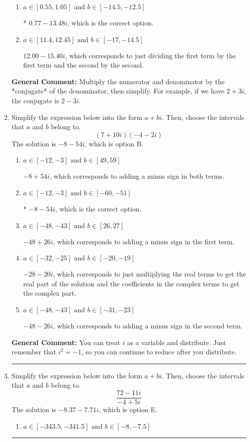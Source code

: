 \documentclass{extbook}[14pt]
\newcommand{\litem}[1]{\item #1

\rule{\textwidth}{0.4pt}}
\begin{document}
\begin{enumerate}
{\begin{enumerate}[label=\Alph*.]
 $0.77  - 822.00 i$, which corresponds to forgetting to multiply the conjugate by the numerator.
\item \( a \in [0.55, 1.05] \text{ and } b \in [-14.5, -12.5] \)

* $0.77  - 13.48 i$, which is the correct option.
\item \( a \in [11.4, 12.45] \text{ and } b \in [-17, -14.5] \)

 $12.00  - 15.40 i$, which corresponds to just dividing the first term by the first term and the second by the second.
\end{enumerate}

\textbf{General Comment:} Multiply the numerator and denominator by the *conjugate* of the denominator, then simplify. For example, if we have $2+3i$, the conjugate is $2-3i$.
}
\litem{
Simplify the expression below into the form $a+bi$. Then, choose the intervals that $a$ and $b$ belong to.
\[ (7 + 10 i)(-4 - 2 i) \]The solution is \( -8 - 54 i \), which is option B.\begin{enumerate}[label=\Alph*.]
\item \( a \in [-12, -3] \text{ and } b \in [49, 59] \)

 $-8 + 54 i$, which corresponds to adding a minus sign in both terms.
\item \( a \in [-12, -3] \text{ and } b \in [-60, -51] \)

* $-8 - 54 i$, which is the correct option.
\item \( a \in [-48, -43] \text{ and } b \in [26, 27] \)

 $-48 + 26 i$, which corresponds to adding a minus sign in the first term.
\item \( a \in [-32, -25] \text{ and } b \in [-20, -19] \)

 $-28 - 20 i$, which corresponds to just multiplying the real terms to get the real part of the solution and the coefficients in the complex terms to get the complex part.
\item \( a \in [-48, -43] \text{ and } b \in [-31, -23] \)

 $-48 - 26 i$, which corresponds to adding a minus sign in the second term.
\end{enumerate}

\textbf{General Comment:} You can treat $i$ as a variable and distribute. Just remember that $i^2=-1$, so you can continue to reduce after you distribute.
}
\litem{
Simplify the expression below into the form $a+bi$. Then, choose the intervals that $a$ and $b$ belong to.
\[ \frac{72 - 11 i}{-4 + 5 i} \]The solution is \( -8.37  - 7.71 i \), which is option E.\begin{enumerate}[label=\Alph*.]
\item \( a \in [-343.5, -341.5] \text{ and } b \in [-8, -7.5] \)


\end{enumerate}}
\end{enumerate}
\end{document}
